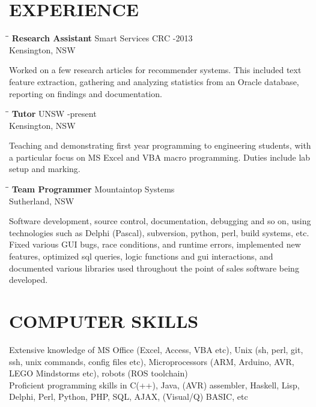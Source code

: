 \documentclass{res}
\begin{document}
\begin{resume}
\section{EXPERIENCE}
   \vspace{-0.1in}	
   \begin{tabbing}
   \hspace{2.3in}\= \hspace{2.6in}\= \kill %
    {\bf Research Assistant} \>Smart Services CRC -2013\\
                             \>Kensington, NSW
   \end{tabbing}\vspace{-20pt}      %
    Worked on a few research articles for recommender systems. This included
    text feature extraction, gathering and analyzing statistics from an Oracle
    database, reporting on findings and documentation.
   \begin{tabbing}
   \hspace{2.3in}\= \hspace{2.6in}\= \kill %
    {\bf Tutor} \>UNSW     -present\\
                             \>Kensington, NSW
   \end{tabbing}\vspace{-20pt}      %
    Teaching and demonstrating first year programming to engineering students,
    with a particular focus on MS Excel and VBA macro programming. Duties
    include lab setup and marking.
   \begin{tabbing}
   \hspace{2.3in}\= \hspace{2.6in}\= \kill %
    {\bf Team Programmer} \>Mountaintop Systems \\
                          \>Sutherland, NSW
   \end{tabbing}\vspace{-20pt}
    Software development, source control, documentation, debugging and
    so on, using technologies such as Delphi (Pascal), subversion,
    python, perl, build systems, etc. Fixed various GUI bugs, race
    conditions, and runtime errors, implemented new features,
    optimized sql queries, logic functions and gui interactions,
    and documented various libraries used throughout the point of
    sales software being developed.


\section{COMPUTER SKILLS}          
    Extensive knowledge of MS Office (Excel, Access, VBA etc), Unix (sh, perl, git, ssh, unix commands, config files etc), Microprocessors (ARM, Arduino, AVR, LEGO Mindstorms etc), robots (ROS toolchain) \\
    Proficient programming skills in C(++), Java, (AVR) assembler, Haskell, Lisp, Delphi, Perl, Python, PHP, SQL, AJAX, (Visual/Q) BASIC, etc
 

\end{resume}
\end{document}
